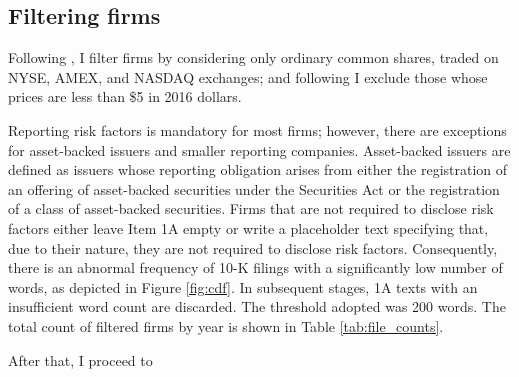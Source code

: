 \documentclass[12pt, letterpaper]{article}
\begin{document}
\subsection{Filtering firms}

Following \cite{Golubov2019-ku, Stambaugh2016-eb}, I filter firms by considering only ordinary common shares, traded on NYSE, AMEX, and NASDAQ exchanges; and following \cite{Stambaugh2016-eb} I exclude those whose prices are less than \$5 in 2016 dollars. 

Reporting risk factors is mandatory for most firms; however, there are exceptions for asset-backed issuers and smaller reporting companies. Asset-backed issuers are defined as issuers whose reporting obligation arises from either the registration of an offering of asset-backed securities under the Securities Act or the registration of a class of asset-backed securities. Firms that are not required to disclose risk factors either leave Item 1A empty or write a placeholder text specifying that, due to their nature, they are not required to disclose risk factors. Consequently, there is an abnormal frequency of 10-K filings with a significantly low number of words, as depicted in Figure \ref{fig:cdf}. In subsequent stages, 1A texts with an insufficient word count are discarded. The threshold adopted was 200 words. The total count of filtered firms by year is shown in Table \ref{tab:file_counts}.

After that, I proceed to 




 


%




\end{document}
